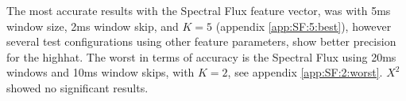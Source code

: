 %			
		
		The most accurate results with the Spectral Flux feature vector, was with 5ms window size, 2ms window skip, and $K=5$ (appendix \ref{app:SF:5:best}), however several test configurations using other feature parameters, show better precision for the highhat. The worst in terms of accuracy is the Spectral Flux using 20ms windows and 10ms window skips, with $K=2$, see appendix \ref{app:SF:2:worst}.	$X^2$ showed no significant results.
